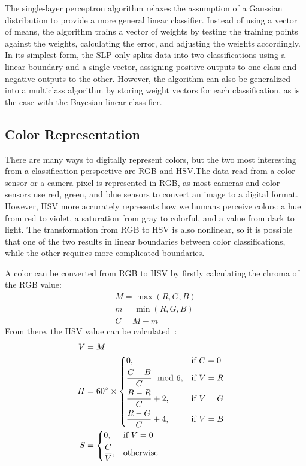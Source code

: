 \documentclass[twoside]{IEEEtran}
\begin{document}
The single-layer perceptron algorithm relaxes the assumption of a Gaussian distribution to
provide a more general linear classifier. Instead of using a vector of means, the algorithm trains a
vector of weights by testing the training points against the weights, calculating the error, and
adjusting the weights accordingly. In its simplest form, the SLP only splits data into two
classifications using a linear boundary and a single vector, assigning positive outputs to one class
and negative outputs to the other. However, the algorithm can also be generalized into a multiclass
algorithm by storing weight vectors for each classification, as is the case with the Bayesian linear
classifier.

\subsection{Color Representation}

There are many ways to digitally represent colors, but the two most interesting from a
classification perspective are RGB and HSV.\@ The data read from a color sensor or a camera pixel
is represented in RGB, as most cameras and color sensors use red, green, and blue sensors to
convert an image to a digital format. However, HSV more accurately represents how we humans
perceive colors: a hue from red to violet, a saturation from gray to colorful, and a value from
dark to light. The transformation from RGB to HSV is also nonlinear, so it is possible that one
of the two results in linear boundaries between color classifications, while the other requires
more complicated boundaries.

A color can be converted from RGB to HSV by firstly calculating the chroma of the RGB value:
\begin{align*}
     & M = \max\left(R, G, B\right) & \\
     & m = \min\left(R, G, B\right) & \\
     & C = M - m                    &
\end{align*}
From there, the HSV value can be calculated~\cite{hsv}:
\begin{align*}
    V & = M                                           &              \\
    H & = 60^\circ \times \begin{dcases}
                              0,                      & \text{if } C = 0 \\
                              \frac{G - B}{C} \mod 6, & \text{if } V = R \\
                              \frac{B - R}{C} + 2,    & \text{if } V = G \\
                              \frac{R - G}{C} + 4,    & \text{if } V = B
                          \end{dcases} & \\
    S & = \begin{dcases}
              0,           & \text{if } V = 0 \\
              \frac{C}{V}, & \text{otherwise}
          \end{dcases}            &
\end{align*}
\end{document}
